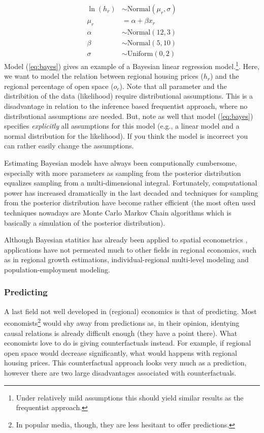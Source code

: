 \documentclass[fleqn,10pt]{SelfArx} %
\begin{document}
\begin{align}
  \ln(h_r) & \sim \text{Normal}(\mu_r, \sigma) \tag{likelihood}\\
  \mu_r & = \alpha + \beta x_r \tag{linear model}\\
  \alpha & \sim \text{Normal}(12,3) \tag{$\alpha$ prior}\\
  \beta & \sim \text{Normal}(5,10) \tag{$\beta$ prior}\\
  \sigma &\sim \text{Uniform}(0,2) \tag{$\sigma$ prior} 
  \label{eq:bayes}         
\end{align}
Model (\ref{eq:bayes}) gives an example of a Bayesian linear regression
model.\footnote{Under relatively mild assumptions this should yield similar
  results as the frequentist approach.}. Here, we want to model the relation
between regional housing prices ($h_r$) and the regional percentage of open
space ($o_c$). Note that all parameter and the distribition of the data
(likelihood) require distributional assumptions. This is a disadvantage in
relation to the inference based frequentist approach, where no distributional
assumptions are needed. But, note as well that model (\ref{eq:bayes}) specifies
\emph{explicitly} all assumptions for this model (e.g., a linear model and a
normal distribution for the likelihood). If you think the model is incorrect you
can rather easily change the assumptions.

Estimating Bayesian models have always been computionally cumbersome, especially
with more parameters as sampling from the posterior distribution equalizes
sampling from a multi-dimensional integral. Fortunately, computational power has
increased dramatically in the last decaded and techniques for sampling from the
posterior distribution have become rather efficient (the most often used
techniques nowadays are Monte Carlo Markov Chain algorithms which is basically a
simulation of the posterior distribution).

Although Bayesian statitics has already been applied to spatial
econometrics \citep[see the excellent textbook
of][]{lesage2009introduction}, applications have not permeated much to other fields
in regional economics, such as in regional growth estimations,
individual-regional multi-level modeling and population-employment modeling.  

\subsubsection{Predicting}

A last field not well developed in (regional) economics is that of predicting.
Most economists\footnote{In popular media, though, they are less hesitant to
  offer predictions.} would shy away from predictions as, in their opinion, identying
causal relations is already difficult enough (they have a point there). What
economists love to do is giving counterfactuals instead. For example, if
regional open space would decrease significantly, what would happens with
regional housing prices. This counterfactual approach looks very much as a
prediction, however there are two large disadvantages associated with
counterfactuals.
\end{document}
